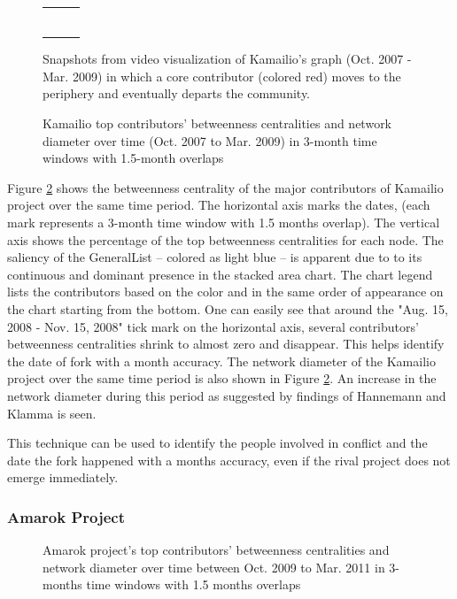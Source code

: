 \documentclass{acm_proc_article-sp}
\begin{document}
\begin{figure}[!ht]
\begin{tabularx}{\linewidth}{@{}cXX@{}}
\begin{tabular}{cccc}
\end{tabular} 
\end{tabularx} 
\caption{Snapshots from video visualization of Kamailio's graph (Oct. 2007 - Mar. 2009) in which a core contributor (colored red) moves to the periphery and eventually departs the community.} 
\label{figureKamailioGraph} 
\end{figure} 

\begin{figure}[!ht]
\centering
{}
\justifying
{}
\caption{Kamailio top contributors' betweenness centralities and network diameter over time (Oct. 2007 to Mar. 2009) in 3-month time windows with 1.5-month overlaps}
\label{figureKamailioStackedAreaChart}
\end{figure}

Figure \ref{figureKamailioStackedAreaChart} shows the betweenness centrality of the major contributors of Kamailio project over the same time period. The horizontal axis marks the dates, (each mark represents a 3-month time window with 1.5 months overlap). The vertical axis shows the percentage of the top betweenness centralities for each node. The saliency of the GeneralList -- colored as light blue -- is apparent due to to its continuous and dominant presence in the stacked area chart. The chart legend lists the contributors based on the color and in the same order of appearance on the chart starting from the bottom. One can easily see that around the "Aug. 15, 2008 - Nov. 15, 2008" tick mark on the horizontal axis, several contributors' betweenness centralities shrink to almost zero and disappear. This helps identify the date of fork with a month accuracy. The network diameter of the Kamailio project over the same time period is also shown in Figure \ref{figureKamailioStackedAreaChart}. An increase in the network diameter during this period as suggested by findings of Hannemann and Klamma \cite{Hannemann} is seen.

This technique can be used to identify the people involved in conflict and the date the fork happened with a months accuracy, even if the rival project does not emerge immediately.

\subsubsection{Amarok Project}
\begin{figure}[!Ht]
\centering
{}
\justifying
{}
\caption{Amarok project's top contributors' betweenness centralities and network diameter over time between Oct. 2009 to Mar. 2011 in 3-months time windows with 1.5 months overlaps}
\label{figureAmarokStachedAreaChart}
\end{figure}
\end{document}
